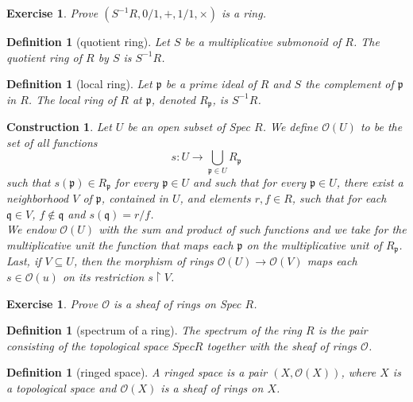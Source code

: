 \documentclass[12pt]{article}
\newtheorem{definition}[proposition]{Definition}
\newtheorem{ex}[proposition]{Exercise}
\newtheorem{cons}[proposition]{Construction}
\begin{document}
\begin{ex}
	Prove $(S^{-1} R, 0/1, +, 1/1, \times)$ is a ring.
\end{ex}		

\begin{definition}[quotient ring]
	Let $S$ be a multiplicative submonoid of $R$. The quotient ring of $R$ by $S$ is $S^{-1} R$. 
\end{definition}

\begin{definition}[local ring]
Let $\mathfrak{p}$ be a prime ideal of $R$ and $S$ the complement of $\mathfrak{p}$ in $R$. The local ring of $R$ at $\mathfrak{p}$, denoted $R_{\mathfrak{p}}$, is $S^{-1} R$. 	
\end{definition}

\begin{cons}
	Let $U$ be an open subset of Spec $R$. We define $\mathscr{O}(U)$ to be the set of all functions 
	\[
	s: U \rightarrow \bigcup \limits_{\mathfrak{p} \in U} R_{\mathfrak{p}}
	\]
	such that $s(\mathfrak{p}) \in R_{\mathfrak{p}}$ for every $\mathfrak{p} \in U$ and such that for every $\mathfrak{p} \in U$, there exist a neighborhood $V$ of $\mathfrak{p}$, contained in $U$, and elements $r, f \in R$, such that for each $\mathfrak{q} \in V$, $f \notin \mathfrak{q}$ and $s(\mathfrak{q}) = r/f$. \\
	We endow $\mathscr{O}(U)$ with the sum and product of such functions and we take for the multiplicative unit the function that maps each $\mathfrak{p}$ on the multiplicative unit of $R_{\mathfrak{p}}$. \\
	Last, if $V \subseteq U$, then the morphism of rings $\mathscr{O}(U) \rightarrow \mathscr{O}(V)$ maps each $s \in \mathscr{O}(u)$ on its restriction $s \restriction V$. 
\end{cons}

\begin{ex}
	Prove $\mathscr{O}$ is a sheaf of rings on Spec $R$. 
\end{ex}			

\begin{definition}[spectrum of a ring]
	The spectrum of the ring $R$ is the pair consisting of the topological space $Spec R$ together with the sheaf of rings $\mathscr{O}$.
\end{definition}

\begin{definition}[ringed space]
	A ringed space is a pair $(X, \mathscr{O}(X))$, where $X$ is a topological space and $\mathscr{O}(X)$ is a sheaf of rings on $X$.
\end{definition}
\end{document}
